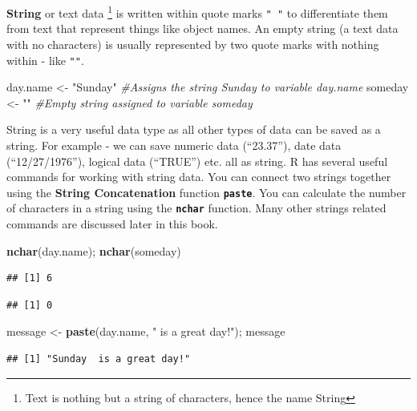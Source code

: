 \documentclass[]{krantz}
\makeatletter
\newenvironment{Shaded}{\begin{snugshade}}{\end{snugshade}}
\newcommand{\KeywordTok}[1]{\textcolor[rgb]{0.27,0.27,0.27}{\textbf{#1}}}
\newcommand{\StringTok}[1]{\textcolor[rgb]{0.5,0.5,0.5}{#1}}
\newcommand{\CommentTok}[1]{\textcolor[rgb]{0.56,0.35,0.01}{\textit{#1}}}
\newcommand{\NormalTok}[1]{#1}
\newenvironment{kframe}{%
\medskip{}
\setlength{\fboxsep}{.8em}
 \def\at@end@of@kframe{}%
 \ifinner\ifhmode%
  \def\at@end@of@kframe{\end{minipage}}%
  \begin{minipage}{\columnwidth}%
 \fi\fi%
 \def\FrameCommand##1{\hskip\@totalleftmargin \hskip-\fboxsep
 \colorbox{shadecolor}{##1}\hskip-\fboxsep
     \hskip-\linewidth \hskip-\@totalleftmargin \hskip\columnwidth}%
 \MakeFramed {\advance\hsize-\width
   \@totalleftmargin\z@ \linewidth\hsize
   \@setminipage}}%
 {\par\unskip\endMakeFramed%
 \at@end@of@kframe}
\renewenvironment{Shaded}{\begin{kframe}}{\end{kframe}}
\theoremstyle{definition}
\theoremstyle{definition}
\theoremstyle{definition}
\theoremstyle{remark}
\makeatother
\begin{document}
\textbf{String} or text data \footnote{Text is nothing but a string of
  characters, hence the name String} is written within quote marks
\texttt{"\ "} to differentiate them from text that represent things like
object names. An empty string (a text data with no characters) is
usually represented by two quote marks with nothing within - like
\texttt{""}.

\begin{Shaded}
\begin{Highlighting}[]
\NormalTok{day.name <-}\StringTok{ "Sunday"} \CommentTok{#Assigns the string Sunday to variable day.name}
\NormalTok{someday <-}\StringTok{ ""} \CommentTok{#Empty string assigned to variable someday}
\end{Highlighting}
\end{Shaded}

String is a very useful data type as all other types of data can be
saved as a string. For example - we can save numeric data (``23.37''),
date data (``12/27/1976''), logical data (``TRUE'') etc. all as string.
R has several useful commands for working with string data. You can
connect two strings together using the \textbf{String Concatenation}
function \textbf{\texttt{paste}}. You can calculate the number of
characters in a string using the \textbf{\texttt{nchar}} function. Many
other strings related commands are discussed later in this book.

\begin{Shaded}
\begin{Highlighting}[]
\KeywordTok{nchar}\NormalTok{(day.name); }\KeywordTok{nchar}\NormalTok{(someday)}
\end{Highlighting}
\end{Shaded}

\begin{verbatim}
## [1] 6
\end{verbatim}

\begin{verbatim}
## [1] 0
\end{verbatim}

\begin{Shaded}
\begin{Highlighting}[]
\NormalTok{message <-}\StringTok{ }\KeywordTok{paste}\NormalTok{(day.name, }\StringTok{" is a great day!"}\NormalTok{); message}
\end{Highlighting}
\end{Shaded}

\begin{verbatim}
## [1] "Sunday  is a great day!"
\end{verbatim}
\end{document}
